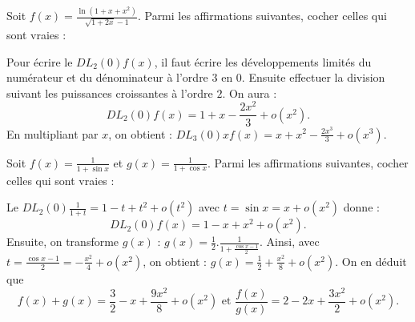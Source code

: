 \begin{question}
Soit $\displaystyle f(x)=\frac{\ln (1+x+x^2)}{\sqrt{1+2x}-1}$. Parmi les affirmations suivantes, cocher celles qui sont vraies :
\begin{answers}  
\end{answers}
\begin{explanations}
Pour écrire le $DL_2(0)f(x)$, il faut écrire les développements limités du numérateur et du dénominateur à l'ordre $3$ en $0$. Ensuite effectuer la division suivant les puissances croissantes à l'ordre $2$. On aura :
$$DL_2(0)f(x)=1+x-\frac{2x^2}{3}+o(x^2).$$
En multipliant par $x$, on obtient : $\displaystyle DL_3(0)xf(x)=x+x^2-\frac{2x^3}{3}+o(x^3)$.
\end{explanations}
\end{question}

\begin{question}
Soit $\displaystyle f(x)=\frac{1}{1+\sin x}$ et $\displaystyle g(x)=\frac{1}{1+\cos x}$. Parmi les affirmations suivantes, cocher celles qui sont vraies :
\begin{answers}  
\end{answers}
\vskip2mm
\begin{explanations}
Le $\displaystyle DL_2(0)\frac{1}{1+t}=1-t+t^2+o(t^2)$ avec $\displaystyle t=\sin x=x+o(x^2)$ donne :
$$DL_2(0)f(x)=1-x+x^2+o(x^2).$$
Ensuite, on transforme $g(x)$ : $\displaystyle g(x)=\frac{1}{2}.\frac{1}{1+\frac{\cos x-1}{2}}$. Ainsi, avec $\displaystyle t=\frac{\cos x-1}{2}=-\frac{x^2}{4}+o(x^2)$, on obtient : $\displaystyle g(x)=\frac{1}{2}+\frac{x^2}{8}+o(x^2)$. On en déduit que
$$f(x)+g(x)=\frac{3}{2}-x+\frac{9x^2}{8}+o(x^2)\mbox{ et }\frac{f(x)}{g(x)}=2-2x+\frac{3x^2}{2}+o(x^2).$$
\end{explanations}
\end{question}

